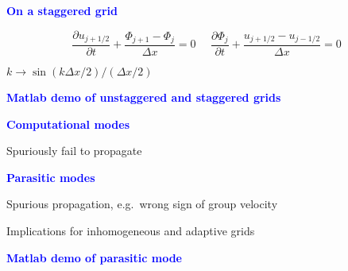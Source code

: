 \documentclass[a4]{seminar}
\newcommand{\B}[1]{\textcolor{blue}{#1}}
\begin{document}

\begin{slide}

\B{\bf On a staggered grid}

\vspace{2mm}

\begin{displaymath}
\frac{\partial u_{j+1/2}}{\partial t} + \frac{\Phi_{j+1} - \Phi_{j}}{\Delta x} = 0
\ \ \ \ \ \ 
\frac{\partial \Phi_j}{\partial t} + \frac{u_{j+1/2} - u_{j-1/2}}{\Delta x} = 0
\end{displaymath}

\vspace{3mm}
\hspace{20mm} \( k \rightarrow \sin (k \Delta x / 2) / ( \Delta x / 2) \)
\vspace{3mm}

\begin{center}
\end{center}



\end{slide}


\begin{slide}

\begin{center}
\B{\bf Matlab demo of unstaggered and staggered grids}
\end{center}

\end{slide}


\begin{slide}

\B{\bf Computational modes}

Spuriously fail to propagate

\vspace{4mm}

\B{\bf Parasitic modes}

Spurious propagation, e.g.\ wrong sign of group velocity

Implications for inhomogeneous and adaptive grids

\begin{center}
\B{\bf Matlab demo of parasitic mode}
\end{center}


\end{slide}
\end{document}
